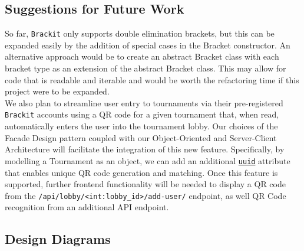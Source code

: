 \documentclass{article}
\begin{document}
\subsection{Suggestions for Future Work}

So far, \texttt{Brackit} only supports double elimination brackets, but this can be expanded easily by the addition of special cases in the Bracket constructor. An alternative approach would be to create an abstract Bracket
class with each bracket type as an extension of the abstract Bracket class. This may allow for 
code that is readable and iterable and would be worth the refactoring time if this project were 
to be expanded. \\
We also plan to streamline user entry to tournaments via their pre-registered \texttt{Brackit} accounts using a QR code for a given tournament that, when read, automatically enters the user into the tournament lobby. Our choices of  
the Facade Design pattern coupled with our Object-Oriented and Server-Client Architecture will facilitate the integration of this new feature. Specifically, by modelling a Tournament as an object, we can add an additional \href{https://docs.python.org/3/library/uuid.html}{\texttt{uuid}}
attribute that enables unique QR code generation and matching. Once this feature is supported, further frontend functionality will be needed to display a QR code from the 
\texttt{/api/lobby/<int:lobby\_id>/add-user/} endpoint, as well QR Code recognition from an additional API endpoint.






\clearpage
\subsection{Design Diagrams}
\end{document}
